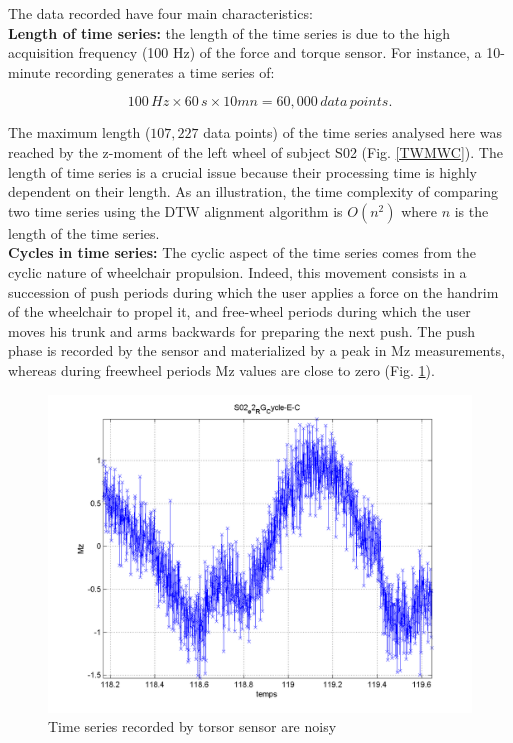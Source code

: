 The data recorded have four main characteristics:
\\
\textbf{Length of time series:} the length of the time series is due to the high acquisition frequency (100 Hz) of the force and torque sensor. For instance, a 10-minute recording generates a time series of:

\[
100 \, Hz \times 60 \, s \times 10 mn = 60,000 \, data \,points.
\]

The maximum length ($107,227$ data points) of the time series analysed here was reached by the z-moment of the left wheel of subject S02 (Fig. \ref{TWMWC}). The length of time series is a crucial issue because their processing time is highly dependent on their length. As an illustration, the time complexity of comparing two time series using the DTW alignment algorithm is $O(n^2)$ where $n$ is the length of the time series.
\\
\textbf{Cycles in time series:} The cyclic aspect of the time series comes from the cyclic nature of wheelchair propulsion. Indeed, this movement consists in a succession of push periods during which the user applies a force on the handrim of the wheelchair to propel it, and free-wheel periods during which the user moves his trunk and arms backwards for preparing the next push. The push phase is recorded by the sensor and materialized by a peak in Mz measurements, whereas during freewheel periods Mz values are close to zero (Fig. \ref{noisyTS}).

\begin{figure}[h]
\center
\includegraphics[scale = 0.5]{images/TSN}
\caption{Time series recorded by torsor sensor are noisy}
\label{noisyTS}
\end{figure}

